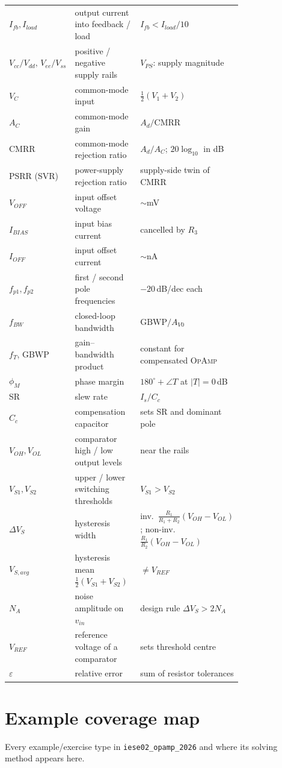 \documentclass[11pt,a4paper,oneside]{book}
\newcommand{\Ad}{A_d}
\newcommand{\op}{\textsc{OpAmp}}
\begin{document}
\begin{longtable}{@{}lp{0.50\linewidth}p{0.27\linewidth}@{}}
$I_{fb},I_{load}$ & output current into feedback / load & $I_{fb}<I_{load}/10$\\
$V_{cc}/V_{dd},\,V_{ee}/V_{ss}$ & positive / negative supply rails & $V_{PS}$: supply magnitude\\
$V_C$ & common-mode input & $\tfrac12(V_1+V_2)$\\
$A_C$ & common-mode gain & $\Ad/\text{CMRR}$\\
CMRR & common-mode rejection ratio & $\Ad/A_C$; $20\log_{10}$ in dB\\
PSRR (SVR) & power-supply rejection ratio & supply-side twin of CMRR\\
$V_{\!OFF}$ & input offset voltage & $\sim$\unit{\milli\volt}\\
$I_{BIAS}$ & input bias current & cancelled by $R_3$\\
$I_{\!OFF}$ & input offset current & $\sim$\unit{\nano\ampere}\\
$f_{p1},f_{p2}$ & first / second pole frequencies & $-20$\,dB/dec each\\
$f_{BW}$ & closed-loop bandwidth & $\text{GBWP}/A_{V0}$\\
$f_T$, GBWP & gain--bandwidth product & constant for compensated \op\\
$\phi_M$ & phase margin & $180^\circ+\angle T$ at $|T|=0$\,dB\\
SR & slew rate & $I_s/C_c$\\
$C_c$ & compensation capacitor & sets SR and dominant pole\\
$V_{OH},V_{OL}$ & comparator high / low output levels & near the rails\\
$V_{S1},V_{S2}$ & upper / lower switching thresholds & $V_{S1}>V_{S2}$\\
$\Delta V_S$ & hysteresis width & inv.\ $\tfrac{R_1}{R_1+R_2}(V_{OH}-V_{OL})$; non-inv.\ $\tfrac{R_1}{R_2}(V_{OH}-V_{OL})$\\
$V_{S,avg}$ & hysteresis mean $\tfrac12(V_{S1}+V_{S2})$ & $\neq V_{REF}$\\
$N_A$ & noise amplitude on $v_{in}$ & design rule $\Delta V_S>2N_A$\\
$V_{REF}$ & reference voltage of a comparator & sets threshold centre\\
$\varepsilon$ & relative error & sum of resistor tolerances\\
\bottomrule
\end{longtable}

\chapter{Example coverage map}\label{app:coverage}
Every example/exercise type in \texttt{iese02\_opamp\_2026} and where its solving
method appears here.
\end{document}
